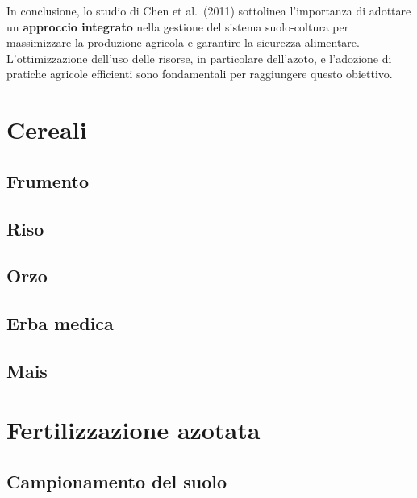 \documentclass[
]{book}
\begin{document}
In conclusione, lo studio di Chen et al.~(2011) sottolinea l'importanza
di adottare un \textbf{approccio integrato} nella gestione del sistema
suolo-coltura per massimizzare la produzione agricola e garantire la
sicurezza alimentare. L'ottimizzazione dell'uso delle risorse, in
particolare dell'azoto, e l'adozione di pratiche agricole efficienti
sono fondamentali per raggiungere questo obiettivo.

\hypertarget{cereali}{%
\section{Cereali}\label{cereali}}

\hypertarget{frumento}{%
\subsection{Frumento}\label{frumento}}

\hypertarget{riso}{%
\subsection{Riso}\label{riso}}

\hypertarget{orzo}{%
\subsection{Orzo}\label{orzo}}

\hypertarget{erba-medica}{%
\subsection{Erba medica}\label{erba-medica}}

\hypertarget{mais}{%
\subsection{Mais}\label{mais}}

\hypertarget{fertilizzazione-azotata}{%
\section{Fertilizzazione azotata}\label{fertilizzazione-azotata}}

\hypertarget{campionamento-del-suolo}{%
\subsection{Campionamento del suolo}\label{campionamento-del-suolo}}
\end{document}
